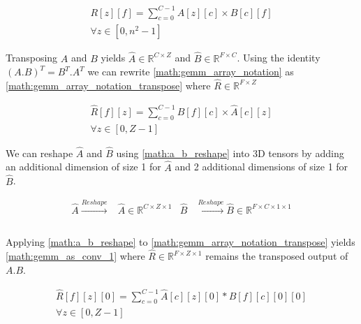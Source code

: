 \begin{equation}
    \begin{aligned}
        R[z][f] = \displaystyle\sum\limits_{c=0}^{C-1}A[z][c]\times B[c][f] \\ \forall z\in[0, n^2-1]
    \end{aligned}
    \label{math:gemm_array_notation}
\end{equation}

Transposing $A$ and $B$ yields $\hat{A} \in \mathbb{R}^{C\times Z}$ and $\hat{B} \in
\mathbb{R}^{F\times C}$. Using the identity $(A.B)^T = B^T.A^T$ we can rewrite
\autoref{math:gemm_array_notation} as
\autoref{math:gemm_array_notation_transpose} where $\hat{R} \in
\mathbb{R}^{F\times Z}$

\begin{equation}
    \begin{aligned}
        \hat{R}[f][z] = \displaystyle\sum\limits_{c=0}^{C-1}\hat{B}[f][c]\times \hat{A}[c][z] \\ \forall z\in[0, Z-1]
    \end{aligned}
    \label{math:gemm_array_notation_transpose}
\end{equation}

We can reshape $\hat{A}$ and $\hat{B}$ using \autoref{math:a_b_reshape} into 3D
tensors by adding an additional dimension of size 1 for $\hat{A}$ and 2
additional dimensions of size 1 for $\hat{B}$.

\begin{equation}
    \begin{aligned}
        \hat{A} \xrightarrow[]{Reshape} &\hat{A}  \in \mathbb{R}^{C \times Z\times 1}   &\hat{B} & \xrightarrow[]{Reshape} \hat{B}  \in \mathbb{R}^{F \times C\times 1\times 1} \\
    \end{aligned}
    \label{math:a_b_reshape}
\end{equation}

Applying \autoref{math:a_b_reshape} to
\autoref{math:gemm_array_notation_transpose} yields
\autoref{math:gemm_as_conv_1} where $\hat{R} \in \mathbb{R}^{F \times Z\times 1}
$ remains the transposed output of $A.B$. 

\begin{equation}
    \begin{aligned}
        \hat{R}[f][z][0] = \displaystyle\sum\limits_{c=0}^{C-1}\hat{A}[c][z][0]*\hat{B}[f][c][0][0] \\ \forall z \in [0, Z-1] 
        \end{aligned}
    \label{math:gemm_as_conv_1}
\end{equation}

